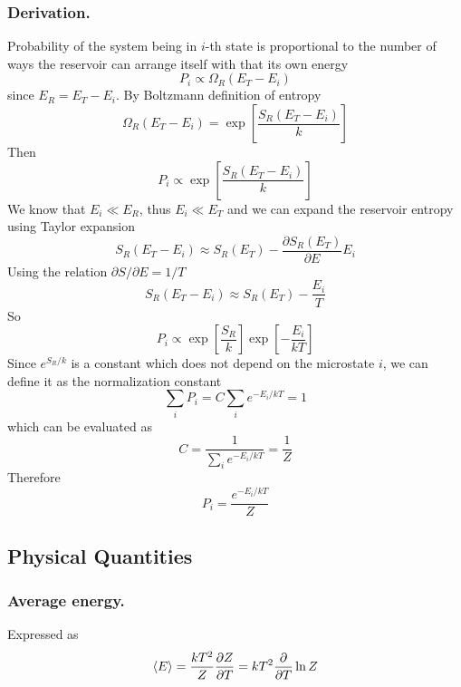 \documentclass[../../../Main.tex]{subfiles}
\begin{document}
\subsubsection*{Derivation.} Probability of the system being in $i$-th state is proportional to the number of ways the reservoir can arrange itself with that its own energy
\begin{equation*}
    P_i\propto \Omega_R(E_T-E_i)
\end{equation*}
since $E_R=E_T-E_i$. By Boltzmann definition of entropy
\begin{equation*}
    \Omega_R(E_T-E_i)=\exp\left[\frac{S_R(E_T-E_i)}{k }\right]
\end{equation*}
Then 
\begin{equation*}
    P_i\propto \exp\left[\frac{S_R(E_T-E_i)}{k }\right]
\end{equation*}
We know that $E_i\ll E_R$, thus $E_i\ll E_T$ and we can expand the reservoir entropy using Taylor expansion
\begin{equation*}
    S_R(E_T-E_i)\approx S_R(E_T)-\frac{\partial S_R(E_T)}{\partial E}E_i
\end{equation*}
Using the relation $\partial S/\partial E=1/T$
\begin{equation*}
    S_R(E_T-E_i)\approx S_R(E_T)-\frac{E_i}{T}
\end{equation*}
So 
\begin{equation*}
    P_i\propto\exp\left[\frac{S_R}{k }\right]\exp\left[-\frac{E_i}{kT}\right]
\end{equation*}
Since $e^{S_R/k}$ is a constant which does not depend on the microstate $i$, we can define it as the normalization constant
\begin{equation*}
    \sum_i P_i=C\sum_i e^{-E_i/kT}=1
\end{equation*}
which can be evaluated as 
\begin{equation*}
    C=\frac{1}{\sum_i e^{-E_i/kT}}=\frac{1}{Z}
\end{equation*}
Therefore
\begin{equation*}
    P_i=\frac{ e^{-E_i/kT}}{Z}
\end{equation*}

\subsection*{Physical Quantities}
\subsubsection*{Average energy.} Expressed as
\begin{equation*}
    \braket{E}=\frac{kT^2}{Z}\frac{\partial Z}{\partial T}=kT^2\frac{\partial}{\partial T}\ln Z
\end{equation*}
\end{document}
